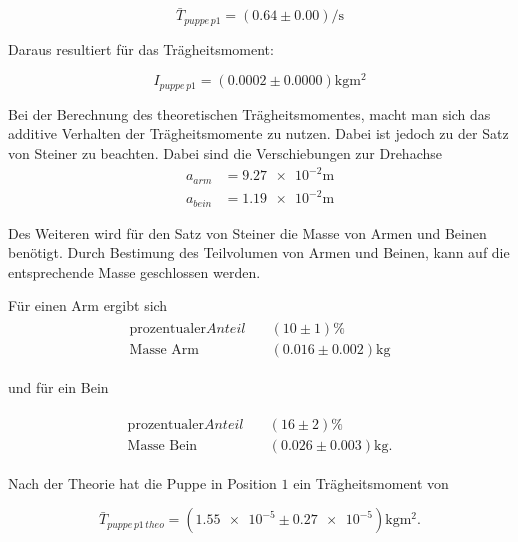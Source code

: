 \begin{equation*}
\bar{T}_{puppe\, p1}=\left(\num{0.64}\pm\num{0.00}\right) \si{\per\second}
\end{equation*}

Daraus resultiert für das Trägheitsmoment:

\begin{equation}
\label{eq:traeg_puppe_p1}
I_{puppe \,p1}= \left(\num{0.0002}\pm\num{0.0000}\right)\si{\kilogram\meter\squared}
\end{equation}

Bei der Berechnung des theoretischen Trägheitsmomentes, macht man sich
das additive Verhalten der Trägheitsmomente zu nutzen.
Dabei ist jedoch zu der Satz von Steiner zu beachten.
 Dabei sind die Verschiebungen zur Drehachse
\begin{align*}
a_{arm}&=\num{9.27e-2}\si{\meter}\\
a_{bein}&=\num{1.19e-2}\si{\meter}
\end{align*}

Des Weiteren wird für den Satz von Steiner die Masse von Armen und Beinen benötigt.
Durch Bestimung des Teilvolumen von Armen und Beinen, kann auf die entsprechende Masse
geschlossen werden.

Für einen Arm ergibt sich
\begin{align}
\begin{aligned}
\label{eq:masse_arm}
\text{prozentualer} Anteil \quad &\left(10\pm\num{1}\right)\% \\
\text{Masse Arm} \quad &\left(\num{0.016}\pm\num{0.002}\right)\si{\kilogram}
\end{aligned}
\end{align}

und für ein Bein

\begin{align}
\begin{aligned}
\label{eq:masse_bein}
\text{prozentualer} Anteil \quad &\left(16\pm\num{2}\right)\% \\
\text{Masse Bein} \quad &\left(\num{0.026}\pm\num{0.003}\right)\si{\kilogram}.
\end{aligned}
\end{align}

Nach der Theorie hat die Puppe in Position $1$ ein Trägheitsmoment von

\begin{equation*}
\bar{T}_{puppe\, p1\,theo}=\left(\num{1.55e-5}\pm\num{0.27e-5}\right) \si{\kilogram\meter\squared}.
\end{equation*}

